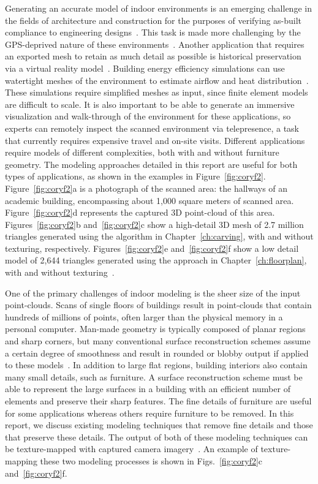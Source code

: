 \documentclass[12pt,onecolumn,oneside]{book}
\begin{document}
Generating an accurate model of indoor environments is an emerging challenge in the fields of architecture and construction for the purposes of verifying as-built compliance to engineering designs~\cite{Bosche10,Xiong13}.  This task is made more challenging by the GPS-deprived nature of these environments~\cite{Liang13}.  Another application that requires an exported mesh to retain as much detail as possible is historical preservation via a virtual reality model~\cite{VillageHeritage,Carving}.  Building energy efficiency simulations can use watertight meshes of the environment to estimate airflow and heat distribution~\cite{EnergyPlus}.  These simulations require simplified meshes as input, since finite element models are difficult to scale.  It is also important to be able to generate an immersive visualization and walk-through of the environment for these applications, so experts can remotely inspect the scanned environment via telepresence, a task that currently requires expensive travel and on-site visits.  Different applications require models of different complexities, both with and without furniture geometry.  The modeling approaches detailed in this report are useful for both types of applications, as shown in the examples in Figure~\ref{fig:coryf2}.  Figure~\ref{fig:coryf2}a is a photograph of the scanned area: the hallways of an academic building, encompassing about 1,000 square meters of scanned area.  Figure~\ref{fig:coryf2}d represents the captured 3D point-cloud of this area.  Figures~\ref{fig:coryf2}b and~\ref{fig:coryf2}c show a high-detail 3D mesh of 2.7 million triangles generated using the algorithm in Chapter~\ref{ch:carving}, with and without texturing, respectively.  Figures~\ref{fig:coryf2}e and~\ref{fig:coryf2}f show a low detail model of 2,644 triangles generated using the approach in Chapter~\ref{ch:floorplan}, with and without texturing~\cite{Turner14Journal}.

One of the primary challenges of indoor modeling is the sheer size of the input point-clouds.  Scans of single floors of buildings result in point-clouds that contain hundreds of millions of points, often larger than the physical memory in a personal computer.  Man-made geometry is typically composed of planar regions and sharp corners, but many conventional surface reconstruction schemes assume a certain degree of smoothness and result in rounded or blobby output if applied to these models~\cite{Powercrust,OctreeSculpting,Carving,ProgressiveMesh,Poisson,EigencrustShewchuk}.  In addition to large flat regions, building interiors also contain many small details, such as furniture.  A surface reconstruction scheme must be able to represent the large surfaces in a building with an efficient number of elements and preserve their sharp features.  The fine details of furniture are useful for some applications whereas others require furniture to be removed.  In this report, we discuss existing modeling techniques that remove fine details and those that preserve these details.  The output of both of these modeling techniques can be texture-mapped with captured camera imagery~\cite{Cheng14}.  An example of texture-mapping these two modeling processes is shown in Figs.~\ref{fig:coryf2}c and~\ref{fig:coryf2}f.
\end{document}
